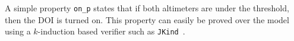 A simple property {\small \texttt{on\_p}} states that if both altimeters are under the threshold, then the DOI is turned on.  This property can easily be proved over the model using a $k$-induction based verifier such as \texttt{JKind}~\cite{jkind}.  %


